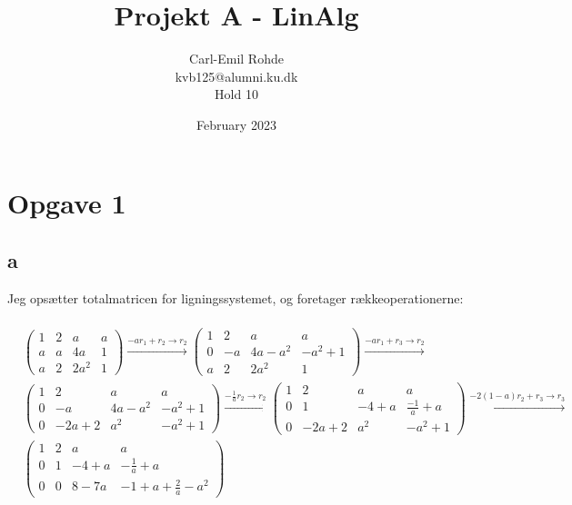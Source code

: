 \documentclass{article}
\title{Projekt A - LinAlg}
\author{Carl-Emil Rohde \\ kvb125@alumni.ku.dk \\ Hold 10}
\date{February 2023}
\begin{document}
\maketitle

\section*{Opgave 1}

\subsection*{a}
Jeg opsætter totalmatricen for ligningssystemet, og foretager rækkeoperationerne:
\\
\\
$\begin{aligned} & \left(\begin{array}{ccc|c}1 & 2 & a & a \\ a & a & 4 a & 1 \\ a & 2 & 2 a^2 & 1\end{array}\right) \stackrel{-a r_1+r_2 \rightarrow r_2}{\longrightarrow}\left(\begin{array}{ccc|c}1 & 2 & a & a \\ 0 & -a & 4 a-a^2 & -a^2+1 \\ a & 2 & 2 a^2 & 1\end{array}\right) \stackrel{-a r_1+r_3 \rightarrow r_2}{\longrightarrow} \\ & \left(\begin{array}{ccc|c}1 & 2 & a & a \\ 0 & -a & 4 a-a^2 & -a^2+1 \\ 0 & -2 a+2 & a^2 & -a^2+1\end{array}\right) \stackrel{-\frac{1}{a} r_2 \rightarrow r_2}{\longrightarrow}\left(\begin{array}{ccc|c}1 & 2 & a & a \\ 0 & 1 & -4+a & \frac{-1}{a}+a \\ 0 & -2a+2 & a^2 & -a^2+1\end{array}\right) \stackrel{-2(1-a) r_2+r_3 \rightarrow r_3}{\longrightarrow} \\ & \left(\begin{array}{lll|l}1 & 2 & a & a \\ 0 & 1 & -4+a & -\frac{1}{a}+a \\ 0 & 0 & 8-7 a & -1+a+\frac{2}{a}-a^2\end{array}\right) \\ & \end{aligned}$
\end{document}
